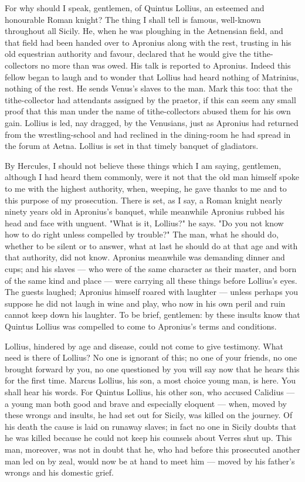  For why should I speak, gentlemen, of Quintus Lollius, an esteemed and honourable Roman knight? The thing I shall tell is famous, well-known throughout all Sicily. He, when he was ploughing in the Aetnensian field, and that field had been handed over to Apronius along with the rest, trusting in his old equestrian authority and favour, declared that he would give the tithe-collectors no more than was owed. His talk is reported to Apronius. Indeed this fellow began to laugh and to wonder that Lollius had heard nothing of Matrinius, nothing of the rest. He sends Venus's slaves to the man. Mark this too: that the tithe-collector had attendants assigned by the praetor, if this can seem any small proof that this man under the name of tithe-collectors abused them for his own gain. Lollius is led, nay dragged, by the Venusians, just as Apronius had returned from the wrestling-school and had reclined in the dining-room he had spread in the forum at Aetna. Lollius is set in that timely banquet of gladiators.

 By Hercules, I should not believe these things which I am saying, gentlemen, although I had heard them commonly, were it not that the old man himself spoke to me with the highest authority, when, weeping, he gave thanks to me and to this purpose of my prosecution. There is set, as I say, a Roman knight nearly ninety years old in Apronius's banquet, while meanwhile Apronius rubbed his head and face with unguent. "What is it, Lollius?" he says. "Do you not know how to do right unless compelled by trouble?" The man, what he should do, whether to be silent or to answer, what at last he should do at that age and with that authority, did not know. Apronius meanwhile was demanding dinner and cups; and his slaves --- who were of the same character as their master, and born of the same kind and place --- were carrying all these things before Lollius's eyes. The guests laughed; Apronius himself roared with laughter --- unless perhaps you suppose he did not laugh in wine and play, who now in his own peril and ruin cannot keep down his laughter. To be brief, gentlemen: by these insults know that Quintus Lollius was compelled to come to Apronius's terms and conditions.

 Lollius, hindered by age and disease, could not come to give testimony. What need is there of Lollius? No one is ignorant of this; no one of your friends, no one brought forward by you, no one questioned by you will say now that he hears this for the first time. Marcus Lollius, his son, a most choice young man, is here. You shall hear his words. For Quintus Lollius, his other son, who accused Calidius --- a young man both good and brave and especially eloquent --- when, moved by these wrongs and insults, he had set out for Sicily, was killed on the journey. Of his death the cause is laid on runaway slaves; in fact no one in Sicily doubts that he was killed because he could not keep his counsels about Verres shut up. This man, moreover, was not in doubt that he, who had before this prosecuted another man led on by zeal, would now be at hand to meet him --- moved by his father's wrongs and his domestic grief.

